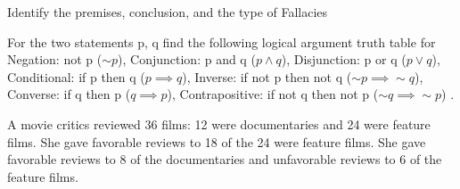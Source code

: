 \documentclass[11pt]{exam}
\begin{document}
\begin{questions}

\addpoints
\question[6] Identify the premises, conclusion, and the type of Fallacies 


\vspace{5cm}
\addpoints
\question[10] For the two statements p, q find the following logical argument truth table for Negation:  not p ($\sim{p}$), Conjunction: p and q ($p\land q$), Disjunction: p or q ($p\lor q$), Conditional: if p then q ($p\implies q$), Inverse: if not p then not q ($\sim{p}\implies \sim q$), Converse: if q then p ($q\implies p$), Contrapositive: if not q then not p ($\sim{q}\implies \sim p$) .



 
\newpage
\addpoints
\question[12] A movie critics reviewed 36 films: 12 were documentaries and 24 were feature films. She gave favorable reviews to 18 of the 24 were feature films. She gave favorable reviews to 8 of the documentaries and unfavorable reviews to 6 of the feature films.
\end{questions}
\end{document}
